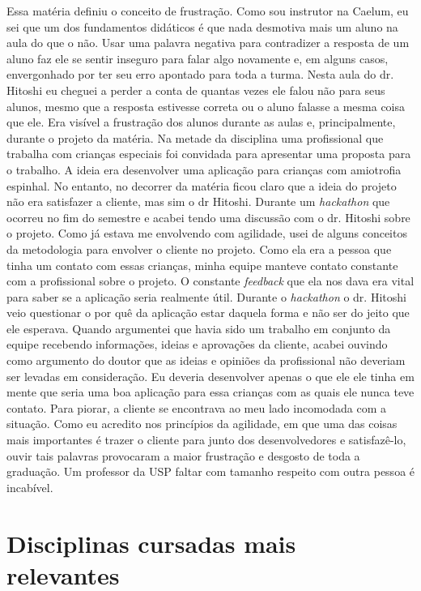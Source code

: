 \documentclass[titlepage,a4paper]{article}
\begin{document}
\begin{itemize}
{	Essa matéria definiu o conceito de frustração. Como sou instrutor na Caelum, eu sei que um dos fundamentos didáticos é que nada desmotiva mais um aluno na aula do que o não. Usar uma palavra negativa para contradizer a resposta de um aluno faz ele se sentir inseguro para falar algo novamente e, em alguns casos, envergonhado por ter seu erro apontado para toda a turma. Nesta aula do dr. Hitoshi eu cheguei a perder a conta de quantas vezes ele falou não para seus alunos, mesmo que a resposta estivesse correta ou o aluno falasse a mesma coisa que ele. Era visível a frustração dos alunos durante as aulas e, principalmente, durante o projeto da matéria. 
	\newline
	Na metade da disciplina uma profissional que trabalha com crianças especiais foi convidada para apresentar uma proposta para o trabalho. A ideia era desenvolver uma aplicação para crianças com amiotrofia espinhal. No entanto, no decorrer da matéria ficou claro que a ideia do projeto não era satisfazer a cliente, mas sim o dr Hitoshi. Durante um \textit{hackathon} que ocorreu no fim do semestre e acabei tendo uma discussão com o dr. Hitoshi sobre o projeto. Como já estava me envolvendo com agilidade, usei de alguns conceitos da metodologia para envolver o cliente no projeto. Como ela era a pessoa que tinha um contato com essas crianças, minha equipe manteve contato constante com a profissional sobre o projeto. O constante \textit{feedback} que ela nos dava era vital para saber se a aplicação seria realmente útil.
	\newline
	Durante o \textit{hackathon} o dr. Hitoshi veio questionar o por quê da aplicação estar daquela forma e não ser do jeito que ele esperava. Quando argumentei que havia sido um trabalho em conjunto da equipe recebendo informações, ideias e aprovações da cliente, acabei ouvindo como argumento do doutor que as ideias e opiniões da profissional não deveriam ser levadas em consideração. Eu deveria desenvolver apenas o que ele ele tinha em mente que seria uma boa aplicação para essa crianças com as quais ele nunca teve contato. Para piorar, a cliente se encontrava ao meu lado incomodada com a situação. Como eu acredito nos princípios da agilidade, em que uma das coisas mais importantes é trazer o cliente para junto dos desenvolvedores e satisfazê-lo, ouvir tais palavras provocaram a maior frustração e desgosto de toda a graduação. Um professor da USP faltar com tamanho respeito com outra pessoa é incabível.}
\end{itemize}

\section{Disciplinas cursadas mais relevantes}
\end{document}
